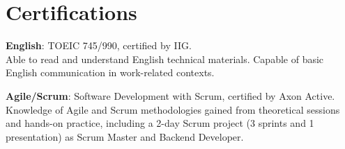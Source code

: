 \section{Certifications} %
    \begin{itemize}[leftmargin=0.15in, label={}]
    \small{\item{
        \textbf{English}{: TOEIC 745/990, certified by IIG. \\
        Able to read and understand English technical materials. Capable of basic English communication in work-related contexts.} \\
    }}


    \small{\item{
        \textbf{Agile/Scrum}{: Software Development with Scrum, certified by Axon Active. \\
        Knowledge of Agile and Scrum methodologies gained from theoretical sessions and hands-on practice, including a 2-day Scrum project (3 sprints and 1 presentation) as Scrum Master and Backend Developer.} \\
    }}
    \end{itemize}